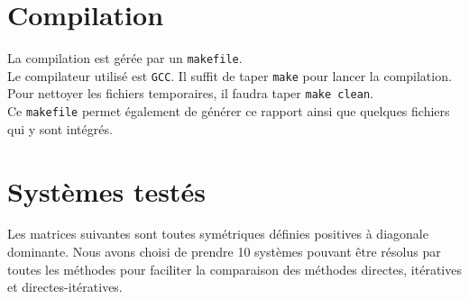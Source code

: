 \documentclass{report}
\begin{document}
	\section{Compilation}
    La compilation est gérée par un \verb"makefile".\\
    Le compilateur utilisé est \verb"GCC".
    Il suffit de taper \verb"make" pour lancer la compilation.\\
    Pour nettoyer les fichiers temporaires, il faudra taper \verb"make clean".\\
    Ce \verb"makefile" permet également de générer ce rapport ainsi que quelques fichiers qui y sont intégrés.

	\newpage
	\section{Systèmes testés}
	  Les matrices suivantes sont toutes symétriques définies positives à diagonale dominante. Nous avons choisi de prendre 10 systèmes pouvant être résolus par toutes les méthodes pour faciliter la comparaison des méthodes directes, itératives et directes-itératives.
	  \vspace{0.5cm}
	  
\end{document}
